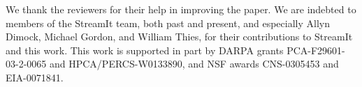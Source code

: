 \documentclass{sigplanconf}
\begin{document}

\pagestyle{plain}
%




%
%





\acks   
We thank the reviewers for their help in improving the
paper. We are indebted to members of the StreamIt team, both past and
present, and especially Allyn Dimock, Michael Gordon, and William
Thies, for their contributions to StreamIt and this work. This work is
supported in part by DARPA grants PCA-F29601-03-2-0065 and
HPCA/PERCS-W0133890, and NSF awards CNS-0305453 and EIA-0071841.


%
%

\end{document}
